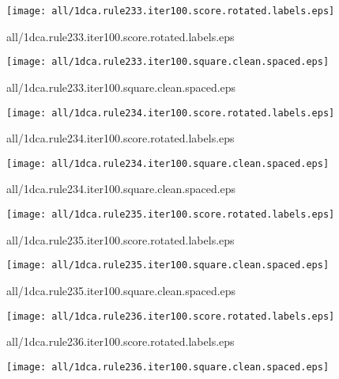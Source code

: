 \documentclass{article}
\begin{document}
\begin{center}
\begin{minipage}{\textwidth}
\texttt{[image: all/1dca.rule233.iter100.score.rotated.labels.eps]}
\end{minipage}
\end{center}
{\footnotesize all/1dca.rule233.iter100.score.rotated.labels.eps}
\begin{center}
\begin{minipage}{\textwidth}
\texttt{[image: all/1dca.rule233.iter100.square.clean.spaced.eps]}
\end{minipage}
\end{center}
{\footnotesize all/1dca.rule233.iter100.square.clean.spaced.eps}
\begin{center}
\begin{minipage}{\textwidth}
\texttt{[image: all/1dca.rule234.iter100.score.rotated.labels.eps]}
\end{minipage}
\end{center}
{\footnotesize all/1dca.rule234.iter100.score.rotated.labels.eps}
\begin{center}
\begin{minipage}{\textwidth}
\texttt{[image: all/1dca.rule234.iter100.square.clean.spaced.eps]}
\end{minipage}
\end{center}
{\footnotesize all/1dca.rule234.iter100.square.clean.spaced.eps}
\begin{center}
\begin{minipage}{\textwidth}
\texttt{[image: all/1dca.rule235.iter100.score.rotated.labels.eps]}
\end{minipage}
\end{center}
{\footnotesize all/1dca.rule235.iter100.score.rotated.labels.eps}
\begin{center}
\begin{minipage}{\textwidth}
\texttt{[image: all/1dca.rule235.iter100.square.clean.spaced.eps]}
\end{minipage}
\end{center}
{\footnotesize all/1dca.rule235.iter100.square.clean.spaced.eps}
\begin{center}
\begin{minipage}{\textwidth}
\texttt{[image: all/1dca.rule236.iter100.score.rotated.labels.eps]}
\end{minipage}
\end{center}
{\footnotesize all/1dca.rule236.iter100.score.rotated.labels.eps}
\begin{center}
\begin{minipage}{\textwidth}
\texttt{[image: all/1dca.rule236.iter100.square.clean.spaced.eps]}
\end{minipage}
\end{center}
\end{document}
